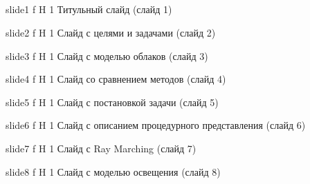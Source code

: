 \begin{appendices}
	\chapter{}
	
	{slide1} %
	{f} %
	{H} %
	{1\textwidth} %
	{Титульный слайд (слайд 1)} %
	
	{slide2} %
	{f} %
	{H} %
	{1\textwidth} %
	{Слайд с целями и задачами (слайд 2)} %
	
	{slide3} %
	{f} %
	{H} %
	{1\textwidth} %
	{Слайд с моделью облаков (слайд 3)} %
	
	{slide4} %
	{f} %
	{H} %
	{1\textwidth} %
	{Слайд со сравнением методов (слайд 4)} %
	
	{slide5} %
	{f} %
	{H} %
	{1\textwidth} %
	{Слайд с постановкой задачи (слайд 5)} %
	
	{slide6} %
	{f} %
	{H} %
	{1\textwidth} %
	{Слайд с описанием процедурного представления (слайд 6)} %
	
	{slide7} %
	{f} %
	{H} %
	{1\textwidth} %
	{Слайд с Ray Marching (слайд 7)} %
	
	{slide8} %
	{f} %
	{H} %
	{1\textwidth} %
	{Слайд с моделью освещения (слайд 8)} %
	

\end{appendices}
